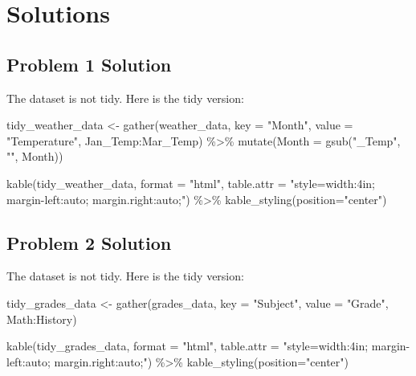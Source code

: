 \documentclass[
  letterpaper,
  DIV=11,
  numbers=noendperiod]{scrreprt}
\newenvironment{Shaded}{\begin{snugshade}}{\end{snugshade}}
\newcommand{\AttributeTok}[1]{\textcolor[rgb]{0.40,0.45,0.13}{#1}}
\newcommand{\FunctionTok}[1]{\textcolor[rgb]{0.28,0.35,0.67}{#1}}
\newcommand{\NormalTok}[1]{\textcolor[rgb]{0.00,0.23,0.31}{#1}}
\newcommand{\OtherTok}[1]{\textcolor[rgb]{0.00,0.23,0.31}{#1}}
\newcommand{\SpecialCharTok}[1]{\textcolor[rgb]{0.37,0.37,0.37}{#1}}
\newcommand{\StringTok}[1]{\textcolor[rgb]{0.13,0.47,0.30}{#1}}
\begin{document}
\section*{Solutions}\label{solutions}


\subsection*{Problem 1 Solution}\label{problem-1-solution}

The dataset is not tidy. Here is the tidy version:

\begin{Shaded}
\begin{Highlighting}[]
\NormalTok{tidy\_weather\_data }\OtherTok{\textless{}{-}} \FunctionTok{gather}\NormalTok{(weather\_data, }\AttributeTok{key =} \StringTok{"Month"}\NormalTok{, }\AttributeTok{value =} \StringTok{"Temperature"}\NormalTok{, Jan\_Temp}\SpecialCharTok{:}\NormalTok{Mar\_Temp) }\SpecialCharTok{\%\textgreater{}\%}
  \FunctionTok{mutate}\NormalTok{(}\AttributeTok{Month =} \FunctionTok{gsub}\NormalTok{(}\StringTok{"\_Temp"}\NormalTok{, }\StringTok{""}\NormalTok{, Month))}

\FunctionTok{kable}\NormalTok{(tidy\_weather\_data, }\AttributeTok{format =} \StringTok{"html"}\NormalTok{, }\AttributeTok{table.attr =} \StringTok{"style=\textquotesingle{}width:4in; margin{-}left:auto; margin.right:auto;\textquotesingle{}"}\NormalTok{)  }\SpecialCharTok{\%\textgreater{}\%}
  \FunctionTok{kable\_styling}\NormalTok{(}\AttributeTok{position=}\StringTok{"center"}\NormalTok{)}
\end{Highlighting}
\end{Shaded}

\subsection*{Problem 2 Solution}\label{problem-2-solution}

The dataset is not tidy. Here is the tidy version:

\begin{Shaded}
\begin{Highlighting}[]
\NormalTok{tidy\_grades\_data }\OtherTok{\textless{}{-}} \FunctionTok{gather}\NormalTok{(grades\_data, }\AttributeTok{key =} \StringTok{"Subject"}\NormalTok{, }\AttributeTok{value =} \StringTok{"Grade"}\NormalTok{, Math}\SpecialCharTok{:}\NormalTok{History)}

\FunctionTok{kable}\NormalTok{(tidy\_grades\_data, }\AttributeTok{format =} \StringTok{"html"}\NormalTok{, }\AttributeTok{table.attr =} \StringTok{"style=\textquotesingle{}width:4in; margin{-}left:auto; margin.right:auto;\textquotesingle{}"}\NormalTok{)  }\SpecialCharTok{\%\textgreater{}\%}
  \FunctionTok{kable\_styling}\NormalTok{(}\AttributeTok{position=}\StringTok{"center"}\NormalTok{)}
\end{Highlighting}
\end{Shaded}
\end{document}
